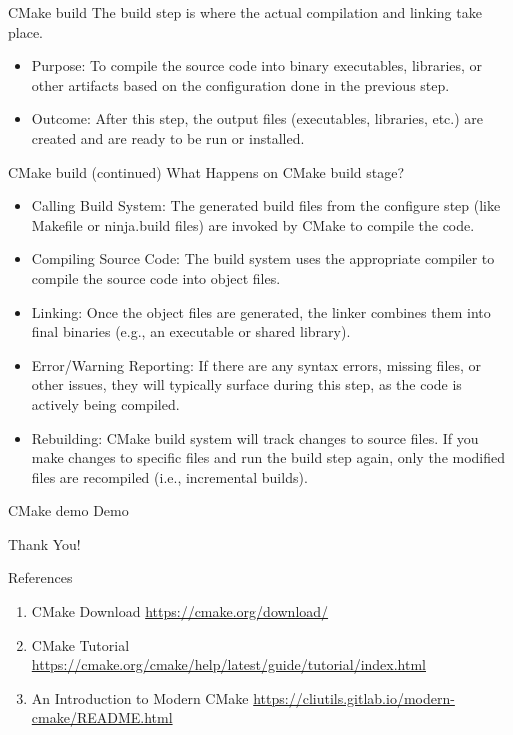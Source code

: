 \documentclass{beamer}
\begin{document}
\begin{frame}{CMake build}
  The build step is where the actual compilation and linking take place.
  \begin{itemize}
    \item Purpose: To compile the source code into binary executables, libraries, or other artifacts based on the configuration done in the previous step.
    \item Outcome: After this step, the output files (executables, libraries, etc.) are created and are ready to be run or installed.
  \end{itemize}
\end{frame}

\begin{frame}{CMake build (continued)}
  What Happens on CMake build stage?
  \begin{itemize}
    \item Calling Build System: The generated build files from the configure step (like Makefile or ninja.build files) are invoked by CMake to compile the code.
    \item Compiling Source Code: The build system uses the appropriate compiler to compile the source code into object files.
    \item Linking: Once the object files are generated, the linker combines them into final binaries (e.g., an executable or shared library).
    \item Error/Warning Reporting: If there are any syntax errors, missing files, or other issues, they will typically surface during this step, as the code is actively being compiled.
    \item Rebuilding: CMake build system will track changes to source files. If you make changes to specific files and run the build step again, only the modified files are recompiled (i.e., incremental builds).
  \end{itemize}
\end{frame}

\begin{frame}{CMake demo}
  Demo
\end{frame}

\begin{frame}
    \centering
    \Huge{Thank You!}
\end{frame}

\begin{frame}{References}
  \begin{enumerate}
    \item CMake Download \href{https://cmake.org/download/}{https://cmake.org/download/}
    \item CMake Tutorial \href{https://cmake.org/cmake/help/latest/guide/tutorial/index.html}{https://cmake.org/cmake/help/latest/guide/tutorial/index.html}
    \item An Introduction to Modern CMake \href{https://cliutils.gitlab.io/modern-cmake/README.html}{https://cliutils.gitlab.io/modern-cmake/README.html}
  \end{enumerate}
\end{frame}
\end{document}
